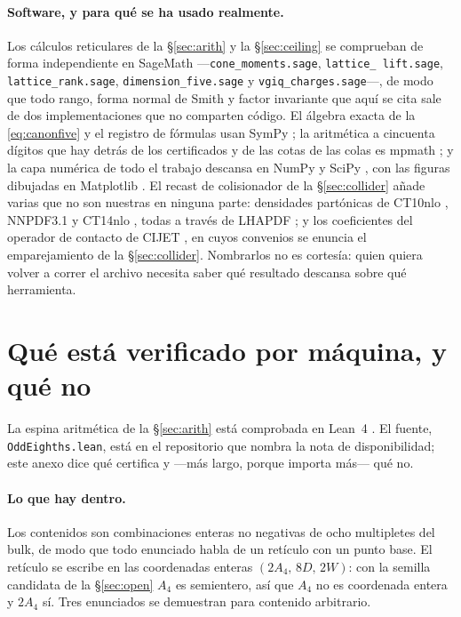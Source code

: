 \documentclass[11pt,a4paper]{article}
\begin{document}
\paragraph{Software, y para qué se ha usado realmente.} Los cálculos reticulares de la
\S\ref{sec:arith} y la \S\ref{sec:ceiling} se comprueban de forma independiente en SageMath
\cite{SageMath} ---\texttt{cone\_\allowbreak moments.sage}, \texttt{lattice\_\allowbreak
lift.sage}, \texttt{lattice\_\allowbreak rank.sage}, \texttt{dimension\_\allowbreak five.sage} y
\texttt{vgiq\_\allowbreak charges.sage}---, de modo que todo rango, forma normal de Smith y factor
invariante que aquí se cita sale de dos implementaciones que no comparten código. El álgebra
exacta de la \eqref{eq:canonfive} y el registro de fórmulas usan SymPy \cite{SymPy}; la aritmética
a cincuenta dígitos que hay detrás de los certificados y de las cotas de las colas es mpmath
\cite{mpmath}; y la capa numérica de todo el trabajo descansa en NumPy \cite{NumPy} y SciPy \cite{SciPy},
con las figuras dibujadas en Matplotlib \cite{Matplotlib}. El recast de colisionador de la
\S\ref{sec:collider} añade varias que no son nuestras en ninguna parte: densidades partónicas de
CT10nlo \cite{CT10}, NNPDF3.1 \cite{NNPDF31} y CT14nlo \cite{CT14}, todas a través de LHAPDF
\cite{LHAPDF}; y los coeficientes del operador de
contacto de CIJET \cite{CIJET}, en cuyos convenios se enuncia el emparejamiento de la
\S\ref{sec:collider}. Nombrarlos no es cortesía: quien quiera
volver a correr el archivo necesita saber qué resultado descansa sobre qué herramienta.


\appendix
\section{Qué está verificado por máquina, y qué no}\label{app:lean}

La espina aritmética de la \S\ref{sec:arith} está comprobada en Lean~4 \cite{Lean4}. El fuente,
\texttt{OddEighths.lean}, está en el repositorio que nombra la nota de disponibilidad; este anexo dice
qué certifica y ---más largo, porque importa más--- qué no.

\paragraph{Lo que hay dentro.} Los contenidos son combinaciones enteras no negativas de ocho
multipletes del bulk, de modo que todo enunciado habla de un retículo con un punto base. El
retículo se escribe en las coordenadas enteras $(2A_4,\,8D,\,2W)$: con la semilla candidata de la
\S\ref{sec:open} $A_4$ es semientero, así que $A_4$ no es coordenada entera y $2A_4$ sí. Tres
enunciados se demuestran para contenido arbitrario.
\end{document}
